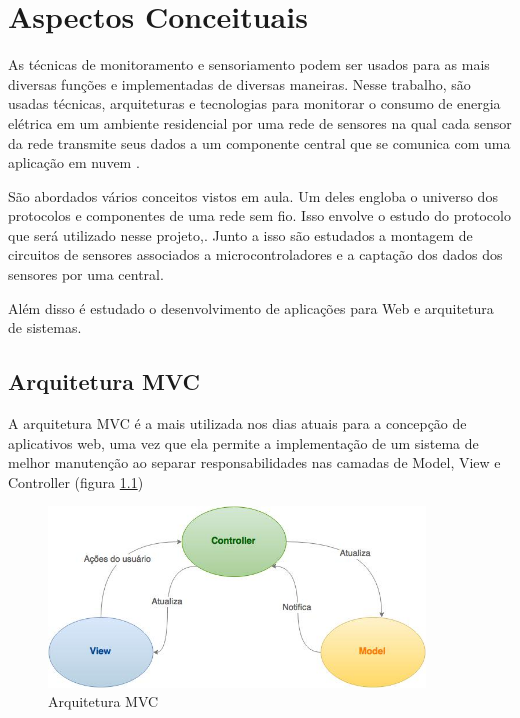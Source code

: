 \chapter{Aspectos Conceituais}
\label{Cap:conceitos}

As técnicas de monitoramento e sensoriamento podem ser usados para as mais diversas funções e implementadas de diversas maneiras. Nesse trabalho, são usadas técnicas, arquiteturas e tecnologias para monitorar o consumo de energia elétrica em um ambiente residencial por uma rede de sensores na qual cada sensor da rede transmite seus dados a um componente central que se comunica com uma aplicação em nuvem  \cite{low_cost_wireless_sensor_network_SMF_master_thesis} \cite{IP_based_wsn_AVFE_article}.

São abordados vários conceitos vistos em aula. Um deles engloba o universo dos protocolos e componentes de uma rede sem fio. Isso envolve o estudo do protocolo que será utilizado nesse projeto,. Junto a isso são estudados a montagem de circuitos de sensores associados a microcontroladores e a captação dos dados dos sensores por uma central.

Além disso é estudado o desenvolvimento de aplicações para Web e arquitetura de sistemas.




\section{Arquitetura MVC }
\label{Sec:MVC}

A arquitetura MVC é a mais utilizada nos dias atuais para a concepção de aplicativos web, uma vez que ela permite a implementação de um sistema de melhor manutenção ao separar responsabilidades nas camadas de Model, View e Controller \cite{MVC_design} (figura \ref{fig:mvc})

\begin{figure}[H]
\centering
\includegraphics[width=10cm,keepaspectratio]{figuras/MVC.jpg}
\caption{\label{fig:mvc} Arquitetura MVC}
\end{figure}

